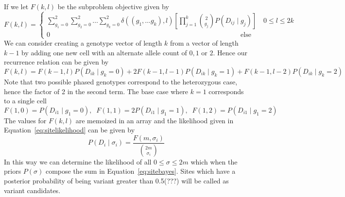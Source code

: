 \documentclass[../../main.tex]{subfiles}
\begin{document}
If we let $F(k,l)$ be the subproblem objective given by
\begin{equation}
F(k,l) = \begin{cases} \sum_{g_1=0}^2\sum_{g_2=0}^2\dots\sum_{g_k=0}^2 \delta((g_1,\dots g_k),l)\left[\prod_{j=1}^{k}\binom{2}{g_j}P(D_{ij}\mid g_{j})\right] \quad 0\leq l \leq 2k \\
0 \qquad\qquad\qquad\qquad\qquad\qquad\qquad\qquad\qquad\qquad\qquad\qquad\qquad\qquad \text{else} \end{cases}
\end{equation}
We can consider creating a genotype vector of length $k$ from a vector of length $k-1$ by adding one new cell with an alternate allele count of $0,1$ or $2$.
Hence our recurrence relation can be given by
\begin{equation}
F(k,l) = F(k-1,l)P(D_{ik}\mid g_k = 0) + 2F(k-1,l-1)P(D_{ik}\mid g_k = 1) + F(k-1,l-2)P(D_{ik}\mid g_k = 2)
\end{equation}
Note that two possible phased genotypes correspond to the heterozygous case, hence the factor of 2 in the second term.
The base case where $k=1$ corresponds to a single cell
\begin{equation*}
F(1,0) = P(D_{i1}\mid g_1 = 0),\;\; F(1,1) = 2P(D_{i1}\mid g_1=1),\;\; F(1,2) = P(D_{i1}\mid g_1 = 2)
\end{equation*}
The values for $F(k,l)$ are memoized in an array and the likelihood given in Equation~\ref{eq:sitelikelihood} can be given by
\begin{equation}
P(D_i\mid \sigma_i)=\frac{F(m,\sigma_i)}{\binom{2m}{\sigma_i}}
\end{equation}
In this way we can determine the likelihood of all $0\leq \sigma\leq 2m$ which when the priors $P(\sigma)$ compose the sum in Equation~\eqref{eq:sitebayes}.
Sites which have a posterior probability of being variant greater than 0.5(???) will be called as variant candidates.
\end{document}
